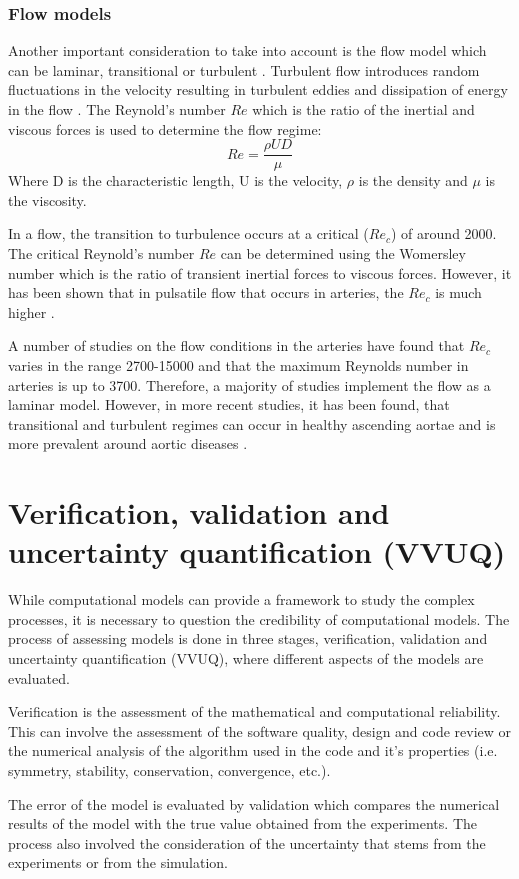 \subsubsection{Flow models}
Another important consideration to take into account is the flow model which can be laminar, transitional or turbulent \cite{Morris2016ComputationalMedicine}. Turbulent flow introduces random fluctuations in the velocity resulting in turbulent eddies and dissipation of energy in the flow \cite{DongenF.N.vandeVosse2003CardiovascularMechanics}. The Reynold's number $Re$ which is the ratio of the inertial and viscous forces is used to determine the flow regime: 
\begin{equation}
Re = \frac{\rho UD}{\mu}
\end{equation}
Where D is the characteristic length, U is the velocity, $\rho$ is the density and $\mu$ is the viscosity.\par

In a flow, the transition to turbulence occurs at a critical ($Re_c$) of around 2000. The critical Reynold's number $Re$ can be determined using the Womersley number which is the ratio of transient inertial forces to viscous forces. However, it has been shown that in pulsatile flow that occurs in arteries, the $Re_c$ is much higher \cite{Alimohammadi2015PredictingApproach}.\par

A number of studies on the flow conditions in the arteries have found that $Re_c$ varies in the range 2700-15000 and that the maximum Reynolds number in arteries is up to 3700. Therefore, a majority of studies implement the flow as a laminar model. However, in more recent studies, it has been found, that transitional and turbulent regimes can occur in healthy ascending aortae and is more prevalent around aortic diseases \cite{Ku1997BLOODARTERIES}. \par




\section{Verification, validation and uncertainty quantification (VVUQ)}
While computational models can provide a framework to study the complex processes, it is necessary to question the credibility of computational models. The process of assessing models is done in three stages, verification, validation and uncertainty quantification (VVUQ), where different aspects of the models are evaluated. \par

Verification is the assessment of the mathematical and computational reliability. This can involve the assessment of the software quality, design and code review or the numerical analysis of the algorithm used in the code and it's properties (i.e. symmetry, stability, conservation, convergence, etc.). \par

The error of the model is evaluated by validation which compares the numerical results of the model with the true value obtained from the experiments. The process also involved the consideration of the uncertainty that stems from the experiments or from the simulation. 
